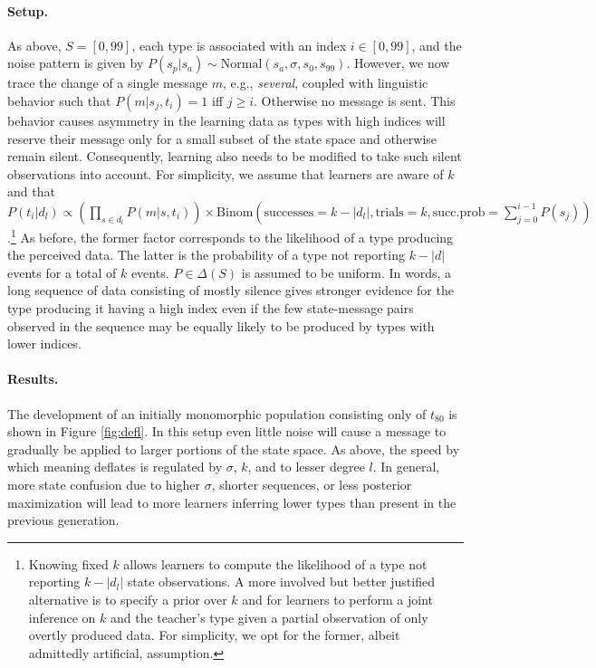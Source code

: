 \documentclass[10pt,a4paper]{article}
\begin{document}
\paragraph{Setup.} As above, $S = [0,99]$, each type is associated with an index $i \in [0,99]$,
and the noise pattern is given by $P(s_p|s_a) \sim \text{Normal}(s_{a},\sigma,s_{0},s_{99})$. However, we
now trace the change of a single message $m$, e.g., {\em several}, coupled with linguistic behavior such that
$P(m|s_j,t_i) = 1$ iff $j \geq i$. Otherwise no message is sent. This behavior
causes asymmetry in the learning data as types with high indices will reserve their message
only for a small subset of the state space and otherwise remain silent. Consequently, learning
also needs to be modified to take such silent observations into account. For simplicity, we
assume that learners are aware of $k$ and that
$P(t_i | d_l) \propto (\prod_{s \in d_l} P(m|s,t_i)) \times \text{Binom}(\text{successes} =
k-|d_l|, \text{trials} = k, \text{succ.prob} = \sum_{j=0}^{i-1} P(s_j))$.\footnote{Knowing fixed $k$ allows learners to compute the likelihood of a type not reporting $k -|d_l|$ state observations. A more involved but better justified alternative is to specify a prior over $k$ and for learners to perform a joint inference on $k$ and the teacher's type given a partial observation of only overtly produced data. For simplicity, we opt for the former, albeit admittedly artificial, assumption.}
As before, the former factor corresponds to the likelihood of a type producing the perceived 
data.  The latter is the probability of a type not reporting $k-|d|$ events for a
total of $k$ events. $P \in \Delta(S)$ is assumed to be uniform. In words, a long sequence of
data consisting of mostly silence gives stronger evidence for the type producing it having a
high index even if the few state-message pairs observed in the sequence may be equally
likely to be produced by types with lower indices.

\paragraph{Results.} The development of an initially monomorphic population consisting only of $t_{80}$ is shown in Figure \ref{fig:defl}. In this setup even little noise will cause a message to gradually be applied to larger portions of the state space. As above, the speed by which meaning deflates is regulated by $\sigma$, $k$, and to lesser degree $l$. In general, more state confusion due to higher $\sigma$, shorter sequences, or less posterior maximization will lead to more learners inferring lower types than present in the previous generation. 
\end{document}
